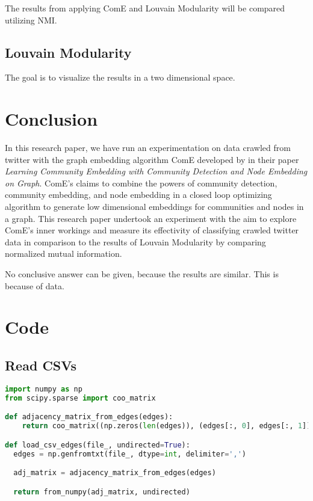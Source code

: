 \documentclass[sigconf]{acmart}
\begin{document}
The results from applying ComE and Louvain Modularity will be compared utilizing NMI.

\subsection{Louvain Modularity}

The goal is to visualize the results in a two dimensional space.

\section{Conclusion}

In this research paper, we have run an experimentation on data crawled from twitter with the graph embedding algorithm ComE developed by \citeauthor{Cav17} in their \citeyear{Cav17} paper \textit{Learning Community Embedding with Community Detection and Node Embedding on Graph}. ComE's claims to combine the powers of community detection, community embedding, and node embedding in a closed loop optimizing algorithm to generate low dimensional embeddings for communities and nodes in a graph. This research paper undertook an experiment with the aim to explore ComE's inner workings and measure its effectivity of classifying crawled twitter data in comparison to the results of Louvain Modularity by comparing normalized mutual information.

No conclusive answer can be given, because the results are similar. This is because of data.







\appendix

\section{Code}

\subsection{Read CSVs} \label{edge_lists}

\begin{lstlisting}[language=python]
import numpy as np
from scipy.sparse import coo_matrix

def adjacency_matrix_from_edges(edges):
    return coo_matrix((np.zeros(len(edges)), (edges[:, 0], edges[:, 1])))

def load_csv_edges(file_, undirected=True):
  edges = np.genfromtxt(file_, dtype=int, delimiter=',')

  adj_matrix = adjacency_matrix_from_edges(edges)

  return from_numpy(adj_matrix, undirected)
\end{lstlisting}
\end{document}

